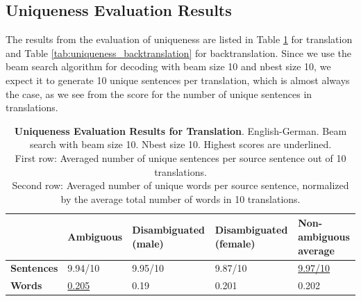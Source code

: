 \subsection{Uniqueness Evaluation Results}
\label{ch:Base_Experiment:Results:Uniqueness}

The results from the evaluation of uniqueness are listed in Table \ref{tab:uniqueness_translation} for translation and Table \ref{tab:uniqueness_backtranslation} for backtranslation.
Since we use the beam search algorithm for decoding with beam size 10 and nbest size 10, we expect it to generate 10 unique sentences per translation, which is almost always the case, as we see from the score for the number of unique sentences in translations. 

\begin{table}[!htb]
    \begin{tabularx}{\linewidth}{|X|XXXX|}
        \hline
         & \textbf{Ambiguous} & \textbf{Disambiguated (male)} & \textbf{Disambiguated (female)} & \textbf{Non-ambiguous average} \\ \hline
         \textbf{Sentences} & 9.94/10 & 9.95/10 & 9.87/10 & \underline{9.97/10} \\ 
         \textbf{Words} & \underline{0.205} & 0.19 & 0.201 & 0.202 \\ \hline
    \end{tabularx}
    \caption{\textbf{Uniqueness Evaluation Results for Translation}. English-German. Beam search with beam size 10. Nbest size 10. Highest scores are underlined. \\ First row: Averaged number of unique sentences per source sentence out of 10 translations. \\ Second row: Averaged number of unique words per source sentence, normalized by the average total number of words in 10 translations.}
    \label{tab:uniqueness_translation}
\end{table}


